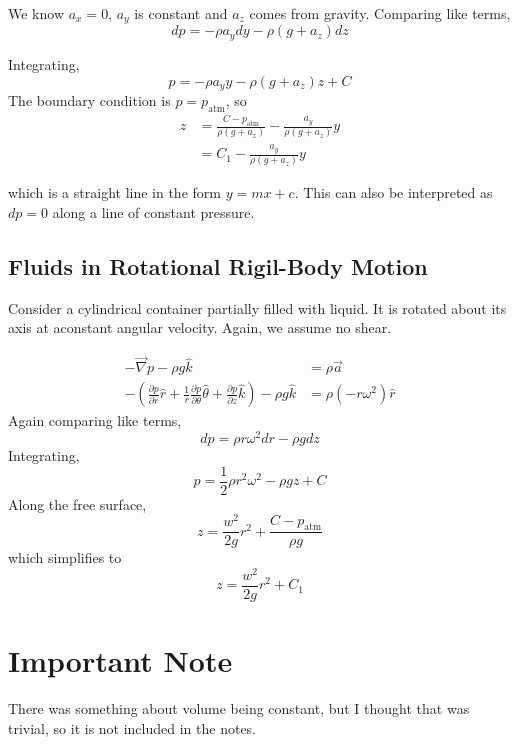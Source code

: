 \documentclass[12pt]{article}
\begin{document}
We know $a_x = 0$, $a_y$ is constant and $a_z$ comes from gravity. Comparing like terms,
$$dp = -\rho a_ydy - \rho(g + a_z)dz$$

Integrating,
$$p = -\rho a_yy - \rho(g+a_z)z + C$$
The boundary condition is $p = p_{\text{atm}}$, so
\begin{align*}
	z &= \frac{C-p_{\text{atm}}}{\rho(g+a_z)} - \frac{a_y}{\rho(g+a_z)}y \\
	  &= C_1 - \frac{a_y}{\rho(g+a_z)}y
\end{align*}

which is a straight line in the form $y = mx + c$. This can also be interpreted as $dp = 0$ along a line of constant pressure.

\subsection{Fluids in Rotational Rigil-Body Motion}
Consider a cylindrical container partially filled with liquid. It is rotated about its axis at aconstant angular velocity. Again, we assume no shear.

\begin{align*}
	-\vec{\nabla}p - \rho g\hat{k} &= \rho \vec{a} \\
	-\left(\frac{\partial p}{\partial r}\hat{r} + \frac{1}{r}\frac{\partial p}{\partial\theta}\hat{\theta} + \frac{\partial p}{\partial z}\hat{k}\right) -\rho g\hat{k} &= \rho (-r\omega^2)\hat{r}
\end{align*}
Again comparing like terms,
$$dp = \rho r\omega^2dr - \rho gdz$$
Integrating,
$$p = \frac{1}{2}\rho r^2\omega^2 - \rho gz + C$$
Along the free surface,
$$z = \frac{w^2}{2g}r^2 + \frac{C - p_{\text{atm}}}{\rho g}$$
which simplifies to
$$z = \frac{w^2}{2g}r^2 + C_1$$

\section{Important Note}
There was something about volume being constant, but I thought that was trivial, so it is not included in the notes.
\end{document}
